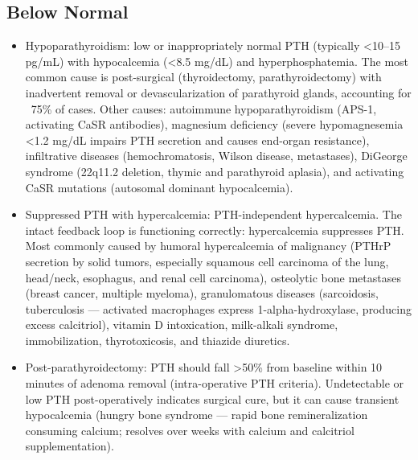 \subsection*{Below Normal}
\begin{itemize}
  \item Hypoparathyroidism: low or inappropriately normal PTH (typically <10--15 pg/mL) with hypocalcemia (<8.5 mg/dL) and hyperphosphatemia. The most common cause is post-surgical (thyroidectomy, parathyroidectomy) with inadvertent removal or devascularization of parathyroid glands, accounting for ~75\% of cases. Other causes: autoimmune hypoparathyroidism (APS-1, activating CaSR antibodies), magnesium deficiency (severe hypomagnesemia <1.2 mg/dL impairs PTH secretion and causes end-organ resistance), infiltrative diseases (hemochromatosis, Wilson disease, metastases), DiGeorge syndrome (22q11.2 deletion, thymic and parathyroid aplasia), and activating CaSR mutations (autosomal dominant hypocalcemia).
  \item Suppressed PTH with hypercalcemia: PTH-independent hypercalcemia. The intact feedback loop is functioning correctly: hypercalcemia suppresses PTH. Most commonly caused by humoral hypercalcemia of malignancy (PTHrP secretion by solid tumors, especially squamous cell carcinoma of the lung, head/neck, esophagus, and renal cell carcinoma), osteolytic bone metastases (breast cancer, multiple myeloma), granulomatous diseases (sarcoidosis, tuberculosis --- activated macrophages express 1-alpha-hydroxylase, producing excess calcitriol), vitamin D intoxication, milk-alkali syndrome, immobilization, thyrotoxicosis, and thiazide diuretics.
  \item Post-parathyroidectomy: PTH should fall >50\% from baseline within 10 minutes of adenoma removal (intra-operative PTH criteria). Undetectable or low PTH post-operatively indicates surgical cure, but it can cause transient hypocalcemia (hungry bone syndrome --- rapid bone remineralization consuming calcium; resolves over weeks with calcium and calcitriol supplementation).
\end{itemize}

